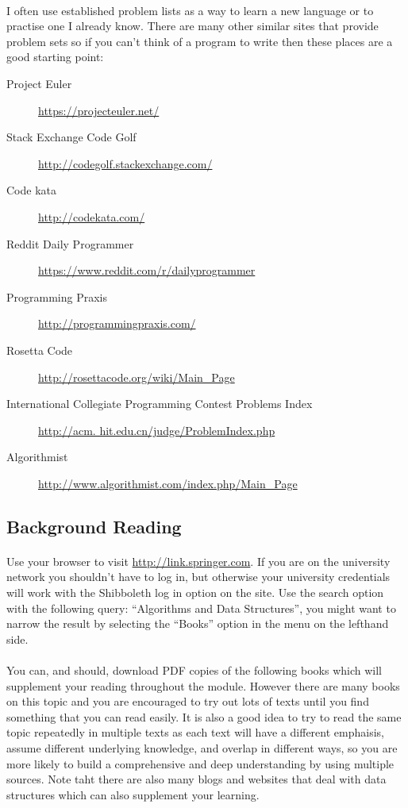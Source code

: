 \documentclass[10pt, a4paper, twosize]{article}
\begin{document}
\paragraph{} I often use established problem lists as a way to learn a new language or to practise one I already know. There are many other similar sites that provide problem sets so if you can't think of a program to write then these places are a good starting point:

\begin{description}
\item[Project Euler]\url{https://projecteuler.net/}
\item[Stack Exchange Code Golf]\url{http://codegolf.stackexchange.com/}
\item[Code kata]\url{http://codekata.com/}
\item[Reddit Daily Programmer]\url{https://www.reddit.com/r/dailyprogrammer}
\item[Programming Praxis]\url{http://programmingpraxis.com/}
\item[Rosetta Code]\url{http://rosettacode.org/wiki/Main_Page}
\item[International Collegiate Programming Contest Problems Index]\url{http://acm. hit.edu.cn/judge/ProblemIndex.php}
\item[Algorithmist]\url{http://www.algorithmist.com/index.php/Main_Page}
\end{description}


\subsection{Background Reading}

\paragraph{} Use your browser to visit \url{http://link.springer.com}. If you are on the university network you shouldn't have to log in, but otherwise your university credentials will work with the Shibboleth log in option on the site. Use the search option with the following query: ``Algorithms and Data Structures'', you might want to narrow the result by selecting the ``Books'' option in the menu on the lefthand side.

\paragraph{} You can, and should, download PDF copies of the following books which will supplement your reading throughout the module. However there are many books on this topic and you are encouraged to try out lots of texts until you find something that you can read easily. It is also a good idea to try to read the same topic repeatedly in multiple texts as each text will have a different emphaisis, assume different underlying knowledge, and overlap in different ways, so you are more likely to build a comprehensive and deep understanding by using multiple sources. Note taht there are also many blogs and websites that deal with data structures which can also supplement your learning.
\end{document}
